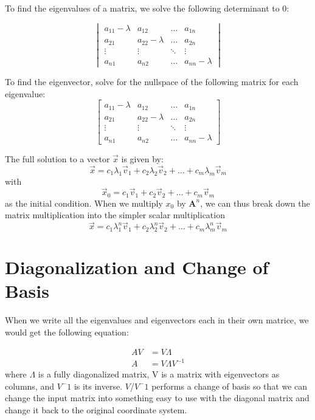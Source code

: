 \documentclass[11pt]{article}
\begin{document}
To find the eigenvalues of a matrix, we solve the following determinant to 0:

\[
\begin{vmatrix}
    a_{11}-\lambda & a_{12} & \dots & a_{1n} \\
    a_{21} & a_{22}-\lambda & \dots & a_{2n} \\
    \vdots & \vdots & \ddots & \vdots \\
    a_{n1} & a_{n2} & \dots & a_{nn}-\lambda  
\end{vmatrix}
\]

To find the eigenvector, solve for the nullspace of the following matrix for each eigenvalue:
\[
\begin{bmatrix}
    a_{11}-\lambda & a_{12} & \dots & a_{1n} \\
    a_{21} & a_{22}-\lambda & \dots & a_{2n} \\
    \vdots & \vdots & \ddots & \vdots \\
    a_{n1} & a_{n2} & \dots & a_{nn}-\lambda  
\end{bmatrix}
\]

The full solution to a vector $\vec{x}$ is given by:
\begin{equation}
    \vec{x} = c_{1}\lambda_{1}\vec{v}_1 + c_{2}\lambda_{2}\vec{v}_{2} + \dots +  c_{m}\lambda_{m}\vec{v}_{m}
\end{equation}
with
\begin{equation}
    \vec{x}_{0} = c_{1}\vec{v}_1 + c_{2}\vec{v}_{2} + \dots +  c_{m}\vec{v}_{m}
\end{equation}
as the initial condition. When we multiply $x_0$ by $\textbf{A}^n$, we can thus break down the matrix multiplication into the simpler scalar multiplication
\begin{equation}
    \vec{x} = c_{1}\lambda_{1}^{n}\vec{v}_1 + c_{2}\lambda_{2}^{n}\vec{v}_{2} + \dots +  c_{m}\lambda_{m}^{n}\vec{v}_{m}
\end{equation}

\section{Diagonalization and Change of Basis}
When we write all the eigenvalues and eigenvectors each in their own matrice, we would get the following equation:

\begin{align}
    AV &= V\Lambda \\
    A &= V\Lambda V^{-1}
\end{align}
where $\Lambda$ is a fully diagonalized matrix, V is a matrix with eigenvectors as columns, and $V^-1$ is its inverse.
$V$/$V^-1$ performs a change of basis so that we can change the input matrix into something easy to use with the diagonal matrix and change it back to the original coordinate system.
\end{document}
